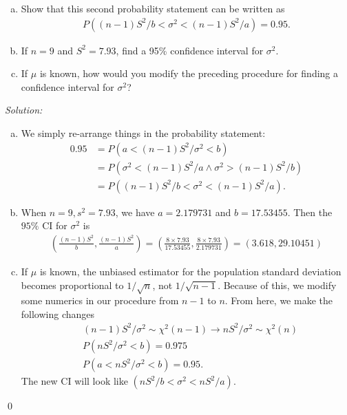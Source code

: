 \documentclass{book}
\theoremstyle{definition}
\newcommand{\nn}{\nonumber}
\newcommand{\f}[2]{\frac{#1}{#2}}
\newcommand{\lp}{\left(}
\newcommand{\rp}{\right)}
\begin{document}
\begin{enumerate}[(a)]
	\item Show that this second probability statement can be written as
	\begin{align}
	P((n - 1)S^2/b < \sigma^2 < (n - 1)S^2/a)=0.95.
	\end{align}
	\item If $n = 9$ and $S^2 = 7.93$, find a 95\% confidence interval for $\sigma^2$.
	\item If $\mu$ is known, how would you modify the preceding procedure for finding a
	confidence interval for $\sigma^2$?
\end{enumerate}


\noindent \textit{Solution:}

\begin{enumerate}[(a)]
	\item We simply re-arrange things in the probability statement:
	\begin{align}
	0.95 &= P(a < (n-1)S^2/\sigma^2 < b) \nn\\
	&= P(\sigma^2 < (n-1)S^2/a \land \sigma^2 > (n-1)S^2/b)\nn\\
	&= P((n-1)S^2/b < \sigma^2 < (n-1)S^2/a).
	\end{align}
	
	\item When $n=9, s^2 = 7.93$, we have $a=2.179731$ and $b=17.53455$. Then the $95\%$ CI for $\sigma^2$ is
	\begin{align}
	\lp \f{(n-1)S^2}{b} , \f{(n-1)S^2}{a} \rp  = \lp \f{8\times 7.93}{17.53455}, \f{8\times 7.93}{2.179731} \rp = \boxed{\lp 3.618, 29.10451 \rp}
	\end{align}
	
	\item If $\mu$ is known, the unbiased estimator for the population standard deviation becomes proportional to $1/\sqrt{n}$, not $1/\sqrt{n-1}$. Because of this, we modify some numerics in our procedure from $n-1$ to $n$. From here, we make the following changes
	\begin{align}
	&(n-1)S^2/\sigma^2 \sim \chi^2(n-1) \to nS^2/\sigma^2 \sim \chi^2(n) \nn\\
	&P(nS^2/\sigma^2 < b) = 0.975\nn\\
	&P(a<nS^2/\sigma^2<b) = 0.95. 
	\end{align}
	The new CI will look like $(nS^2/b < \sigma^2 < nS^2/a)$.
\end{enumerate}\qed
\end{document}
